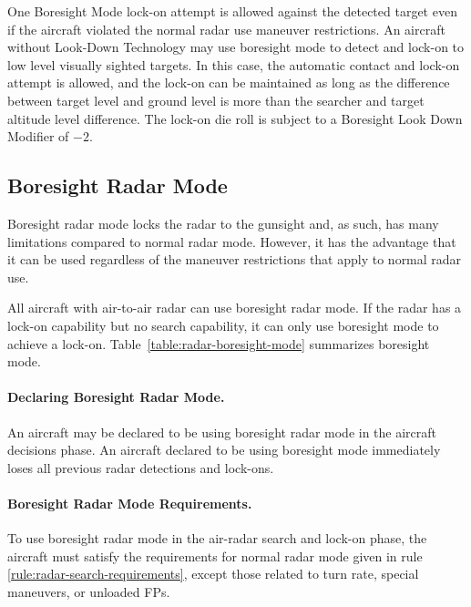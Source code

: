 \begin{advancedrules}
{One Boresight Mode lock-on attempt is allowed against the detected target even if the aircraft violated the normal radar use maneuver restrictions. An aircraft without Look-Down Technology may use boresight mode to detect and lock-on to low level visually sighted targets. In this case, the automatic contact and lock-on attempt is allowed, and the lock-on can be maintained as long as the difference between target level and ground level is more than the searcher and target altitude level difference. The lock-on die roll is subject to a Boresight Look Down Modifier of $-2$. 
}{
\subsection{Boresight Radar Mode} 
\label{rule:boresight-radar-mode}

Boresight radar mode locks the radar to the gunsight and, as such, has many limitations compared to normal radar mode. However, it has the advantage that it can be used regardless of the maneuver restrictions that apply to normal radar use.

All aircraft with air-to-air radar can use boresight radar mode. If the radar has a lock-on capability but no search capability, it can only use boresight mode to achieve a lock-on. Table~\ref{table:radar-boresight-mode} summarizes boresight mode.

\paragraph{Declaring Boresight Radar Mode.} An aircraft may be declared to be using boresight radar mode in the aircraft decisions phase. An aircraft declared to be using boresight mode immediately loses all previous radar detections and lock-ons. 

\paragraph{Boresight Radar Mode Requirements.} To use boresight radar mode in the air-radar search and lock-on phase, the aircraft must satisfy the requirements for normal radar mode given in rule \ref{rule:radar-search-requirements}, except those related to turn rate, special maneuvers, or unloaded FPs.


}
\end{advancedrules}
